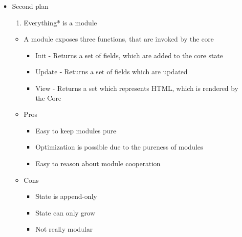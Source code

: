 \begin{itemize}
  \item Second plan

    \begin{enumerate}
      \item Everything* is a module
    \end{enumerate}

    \begin{itemize}
      \item A module exposes three functions, that are invoked by the core

        \begin{itemize}
          \item Init - Returns a set of fields, which are added to the core state

          \item Update - Returns a set of fields which are updated

          \item View - Returns a set which represents HTML, which is rendered by
            the Core
        \end{itemize}

      \item Pros

        \begin{itemize}
          \item Easy to keep modules pure

          \item Optimization is possible due to the pureness of modules

          \item Easy to reason about module cooperation
        \end{itemize}

      \item Cons

        \begin{itemize}
          \item State is append-only

          \item State can only grow

          \item Not really modular
        \end{itemize}
    \end{itemize}
\end{itemize}




